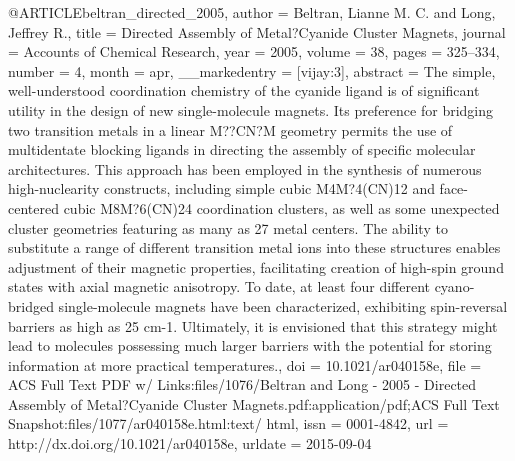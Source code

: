 @ARTICLE{beltran_directed_2005,
  author = {Beltran, Lianne M. C. and Long, Jeffrey R.},
  title = {Directed {Assembly} of {Metal}?{Cyanide} {Cluster} {Magnets}},
  journal = {Accounts of Chemical Research},
  year = {2005},
  volume = {38},
  pages = {325--334},
  number = {4},
  month = apr,
  __markedentry = {[vijay:3]},
  abstract = {The simple, well-understood coordination chemistry of the cyanide
	ligand is of significant utility in the design of new single-molecule
	magnets. Its preference for bridging two transition metals in a linear
	M??CN?M geometry permits the use of multidentate blocking ligands
	in directing the assembly of specific molecular architectures. This
	approach has been employed in the synthesis of numerous high-nuclearity
	constructs, including simple cubic M4M?4(CN)12 and face-centered
	cubic M8M?6(CN)24 coordination clusters, as well as some unexpected
	cluster geometries featuring as many as 27 metal centers. The ability
	to substitute a range of different transition metal ions into these
	structures enables adjustment of their magnetic properties, facilitating
	creation of high-spin ground states with axial magnetic anisotropy.
	To date, at least four different cyano-bridged single-molecule magnets
	have been characterized, exhibiting spin-reversal barriers as high
	as 25 cm-1. Ultimately, it is envisioned that this strategy might
	lead to molecules possessing much larger barriers with the potential
	for storing information at more practical temperatures.},
  doi = {10.1021/ar040158e},
  file = {ACS Full Text PDF w/ Links:files/1076/Beltran and Long - 2005 - Directed Assembly of          Metal?Cyanide Cluster Magnets.pdf:application/pdf;ACS Full Text Snapshot:files/1077/ar040158e.html:text/  html},
  issn = {0001-4842},
  url = {http://dx.doi.org/10.1021/ar040158e},
  urldate = {2015-09-04}
}

